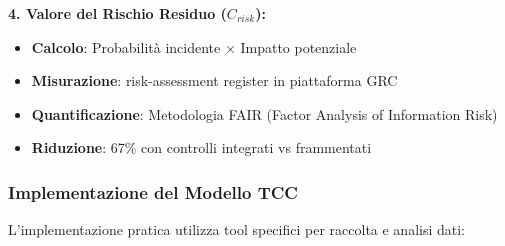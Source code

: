 \textbf{4. Valore del Rischio Residuo ($C_{risk}$):}
\begin{itemize}
    \item \textbf{Calcolo}: Probabilità incidente × Impatto potenziale
    \item \textbf{Misurazione}: \gls{risk-assessment} register in piattaforma GRC
    \item \textbf{Quantificazione}: Metodologia FAIR (Factor Analysis of Information Risk)
    \item \textbf{Riduzione}: 67\% con controlli integrati vs frammentati
\end{itemize}

\subsubsection{\texorpdfstring{Implementazione del Modello TCC}{4.6.1.2 - Implementazione del Modello TCC}}

L'implementazione pratica utilizza tool specifici per raccolta e analisi dati:

